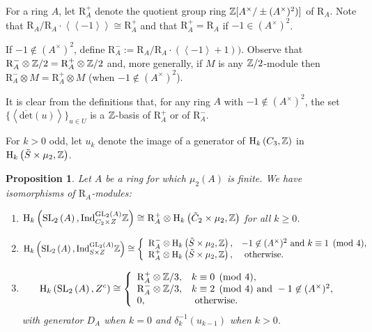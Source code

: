 \documentclass[12pt]{amsart}
\newtheorem{prop}[lem]{Proposition}
\theoremstyle{definition}
\newcommand{\Z}{\Bbb{Z}}
\newcommand{\spl}[2]{\operatorname{SL}_{#1}\left(#2\right)}
\newcommand{\gl}[2]{\mathrm{GL}_{#1}(#2)}
\newcommand{\cconst}[1]{D_{#1}}
\newcommand{\<}{\langle}
\renewcommand{\>}{\rangle}
\newcommand{\sgr}[1]{\mathrm{R}_{#1}}%
\newcommand{\qsgr}[1]{\mathrm{R}^{+}_{#1}} %
\newcommand{\msgr}[1]{\mathrm{R}^{-}_{#1}} %
\newcommand{\an}[1]{\left\langle{#1}\right\rangle}
\newcommand{\pf}[1]{\left\langle\!\left\langle{#1}\right\rangle\!\right\rangle}
\newcommand{\odet}{\overline{\mathrm{det}}}
\newcommand{\ho}[3]{\mathrm{H}_{#1}\left( #2,#3 \right)}
\newcommand{\Ind}[3]{\mathrm{Ind}_{#1}^{#2}#3}
\begin{document}
For a ring $A$, let $\qsgr{A}$ denote the quotient group ring 
$\Z[A^\times/\pm(A^\times)^2)]$ of $\sgr{A}$. Note that $\sgr{A}/\sgr{A}\cdot\pf{-1}\cong \qsgr{A}$ and that $\qsgr{A}=\sgr{A}$ if $-1\in(A^\times)^2$.

If $-1\not\in (A^\times)^2$, define $\msgr{A}:=\sgr{A}/\sgr{A}\cdot(\an{-1}+1))$. Observe that $\msgr{A}\otimes\Z/2=\qsgr{A}\otimes \Z/2$ and, more generally, if $M$ is any $\Z/2$-module then $\msgr{A}\otimes  M=\qsgr{A}\otimes M$ (when $-1\not\in (A^\times)^2$).

It is clear from the definitions that, for any ring $A$ with $-1\not\in (A^\times)^2$,  the set $\{ \an{\odet(u)}\}_{u\in U}$ is a $\Z$-basis of $\qsgr{A}$ or of $\msgr{A}$.

For $k>0$ odd, let $u_k$ denote the image of a generator of $\ho{k}{C_3}{\Z}$ in $\ho{k}{\tilde{S}\times\mu_2}{\Z}$. 

\begin{prop}\label{prop:hokzc} Let $A$ be a ring for which $\mu_2(A)$ is finite. We have isomorphisms of $\sgr{A}$-modules:
\begin{enumerate}
\item
$\ho{k}{\spl{2}{A}}{\Ind{{C}_2\times Z}{\gl{2}{A}}{\Z}}\cong \qsgr{A}\otimes\ho{k}{\tilde{C}_2\times\mu_2}{\Z}$ for all $k\geq 0$.
\item
\[
\ho{k}{\spl{2}{A}}{\Ind{S\times Z}{\gl{2}{A}}{\Z}}\cong 
\left\{
\begin{array}{ll}
\msgr{A}\otimes \ho{k}{\tilde{S}\times\mu_2}{\Z}, &  -1\not\in (A^\times)^2\mbox{ and } k\equiv 1\pmod{4},\\
\qsgr{A}\otimes \ho{k}{\tilde{S}\times\mu_2}{\Z}, &\mbox{ otherwise.}\\
\end{array}
\right.
\]
\item 
\[
\ho{k}{\spl{2}{A}}{Z^c}\cong 
\left\{
\begin{array}{ll}
\qsgr{A}\otimes \Z/3, &  k\equiv 0\pmod{4},\\
\msgr{A}\otimes \Z/3, & k\equiv 2\pmod{4} \mbox{ and } -1\not\in (A^\times)^2,\\
0,&\mbox{ otherwise.}\\
\end{array}
\right.
\]
with generator $\cconst{A}$ when $k=0$ and $\delta_k^{-1}(u_{k-1})$ when $k>0$.
\end{enumerate}
\end{prop}
\end{document}
